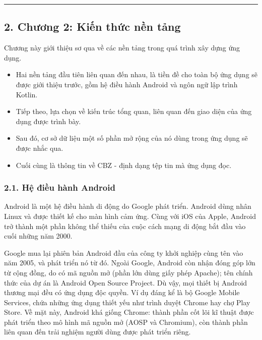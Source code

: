 \documentclass[
]{article}
\providecommand{\tightlist}{%
  \setlength{\itemsep}{0pt}\setlength{\parskip}{0pt}}
\begin{document}
\begin{center}\rule{0.5\linewidth}{0.5pt}\end{center}

\hypertarget{chux1b0ux1a1ng-2-kiux1ebfn-thux1ee9c-nux1ec1n-tux1ea3ng}{%
\subsection{\texorpdfstring{2. Chương 2: Kiến thức nền tảng
}{2. Chương 2: Kiến thức nền tảng }}\label{chux1b0ux1a1ng-2-kiux1ebfn-thux1ee9c-nux1ec1n-tux1ea3ng}}

Chương này giới thiệu sơ qua về các nền tảng trong quá trình xây dựng
ứng dụng.

\begin{itemize}
\tightlist
\item
  Hai nền tảng đầu tiên liên quan đến nhau, là tiền đề cho toàn bộ ứng
  dụng sẽ được giới thiệu trước, gồm hệ điều hành Android và ngôn ngữ
  lập trình Kotlin.
\item
  Tiếp theo, lựa chọn về kiến trúc tổng quan, liên quan đến giao diện
  của ứng dụng được trình bày.
\item
  Sau đó, cơ sở dữ liệu một số phần mở rộng của nó dùng trong ứng dụng
  sẽ được nhắc qua.
\item
  Cuối cùng là thông tin về CBZ - định dạng tệp tin mà ứng dụng đọc.
\end{itemize}

\hypertarget{hux1ec7-ux111iux1ec1u-huxe0nh-android}{%
\subsubsection{\texorpdfstring{2.1. Hệ điều hành Android
}{2.1. Hệ điều hành Android }}\label{hux1ec7-ux111iux1ec1u-huxe0nh-android}}

Android là một hệ điều hành di động do Google phát triển. Android dùng
nhân Linux và được thiết kế cho màn hình cảm ứng. Cùng với iOS của
Apple, Android trở thành một phần không thể thiếu của cuộc cách mạng di
động bắt đầu vào cuối những năm 2000.

Google mua lại phiên bản Android đầu của công ty khởi nghiệp cùng tên
vào năm 2005, và phát triển nó từ đó. Ngoài Google, Android còn nhận
đóng góp lớn từ cộng đồng, do có mã nguồn mở (phần lớn dùng giấy phép
Apache); tên chính thức của dự án là Android Open Source Project. Dù
vậy, mọi thiết bị Android thương mại đều có ứng dụng độc quyền. Ví dụ
đáng kể là bộ Google Mobile Services, chứa những ứng dụng thiết yếu như
trình duyệt Chrome hay chợ Play Store. Về mặt này, Android khá giống
Chrome: thành phần cốt lõi kĩ thuật được phát triển theo mô hình mã
nguồn mở (AOSP và Chromium), còn thành phần liên quan đến trải nghiệm
người dùng được phát triển riêng.
\end{document}

